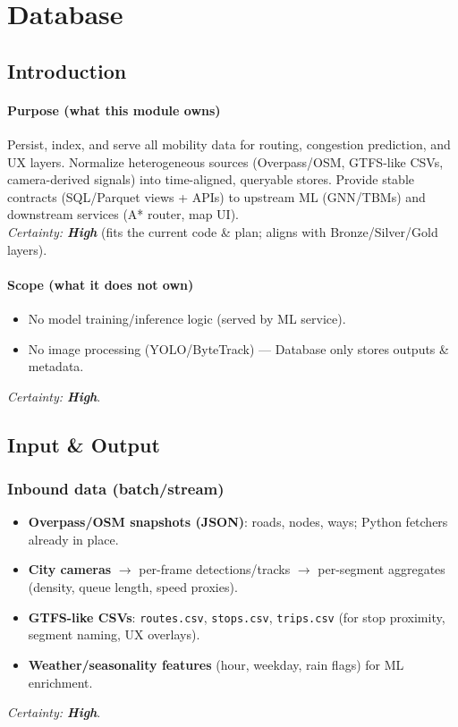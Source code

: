 \section{Database}
\label{sec:database}
\subsection{Introduction}
\paragraph{Purpose (what this module owns)}
Persist, index, and serve all mobility data for routing, congestion prediction, and UX layers. Normalize heterogeneous sources (Overpass/OSM, GTFS-like CSVs, camera-derived signals) into time-aligned, queryable stores. Provide stable contracts (SQL/Parquet views + APIs) to upstream ML (GNN/TBMs) and downstream services (A* router, map UI).\\
	\textit{Certainty: \textbf{High}} (fits the current code \& plan; aligns with Bronze/Silver/Gold layers).

\paragraph{Scope (what it does not own)}
\begin{itemize}
  \item No model training/inference logic (served by ML service).
  \item No image processing (YOLO/ByteTrack) --- Database only stores outputs \& metadata.
\end{itemize}
	\textit{Certainty: \textbf{High}}.

\subsection{Input \& Output}
\subsubsection{Inbound data (batch/stream)}
\begin{itemize}
  \item \textbf{Overpass/OSM snapshots (JSON)}: roads, nodes, ways; Python fetchers already in place.
  \item \textbf{City cameras} $\rightarrow$ per-frame detections/tracks $\rightarrow$ per-segment aggregates (density, queue length, speed proxies).
  \item \textbf{GTFS-like CSVs}: \texttt{routes.csv}, \texttt{stops.csv}, \texttt{trips.csv} (for stop proximity, segment naming, UX overlays).
  \item \textbf{Weather/seasonality features} (hour, weekday, rain flags) for ML enrichment.
\end{itemize}
	\textit{Certainty: \textbf{High}}.

